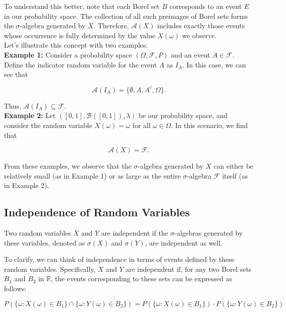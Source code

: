 To understand this better, note that each Borel set \(B\) corresponds to an event \(E\) in our probability space. The collection of all such preimages of Borel sets forms the \(\sigma\)-algebra generated by \(X\). Therefore, \(\mathcal{A}(X)\) includes exactly those events whose occurrence is fully determined by the value \(X(\omega)\) we observe.\\

Let's illustrate this concept with two examples:\\

\textbf{Example 1:} Consider a probability space \((\Omega, \mathcal{F}, P)\) and an event \(A \in \mathcal{F}\). Define the indicator random variable for the event \(A\) as \(I_A\). In this case, we can see that 

\[
\mathcal{A}(I_A) = \{\emptyset, A, A^c, \Omega\}.
\]

Thus, \(\mathcal{A}(I_A) \subseteq \mathcal{F}\).\\

\textbf{Example 2:} Let \(([0, 1], \mathcal{B}([0, 1]), \lambda)\) be our probability space, and consider the random variable \(X(\omega) = \omega\) for all \(\omega \in \Omega\). In this scenario, we find that 

\[
\mathcal{A}(X) = \mathcal{F}.
\]

From these examples, we observe that the \(\sigma\)-algebra generated by \(X\) can either be relatively small (as in Example 1) or as large as the entire \(\sigma\)-algebra \(\mathcal{F}\) itself (as in Example 2).

\subsection{Independence of Random Variables}

\begin{definition}
    Two random variables \(X\) and \(Y\) are independent if the \(\sigma\)-algebras generated by these variables, denoted as \(\sigma(X)\) and \(\sigma(Y)\), are independent as well. 
\end{definition}

To clarify, we can think of independence in terms of events defined by these random variables. Specifically, \(X\) and \(Y\) are independent if, for any two Borel sets \(B_1\) and \(B_2\) in \(\mathbb{R}\), the events corresponding to these sets can be expressed as follows:

\[
P\left(\{\omega : X(\omega) \in B_1\} \cap \{\omega : Y(\omega) \in B_2\}\right) = P\left(\{\omega : X(\omega) \in B_1\}\right) \cdot P\left(\{\omega : Y(\omega) \in B_2\}\right)
\]

